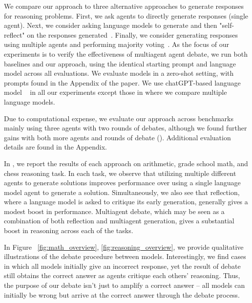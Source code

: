  




 We compare our approach to three alternative approaches to generate responses for reasoning problems. First, we ask agents to directly generate responses (single agent). Next, we consider asking language models to generate and then "self-reflect" on the responses generated~\cite{reflexion, madaan2023self}. Finally, we consider generating responses using multiple agents and performing majority voting~\cite{alphacode,verifier}. As the focus of our experiments is to verify the effectiveness of multiagent agent debate, we run both baselines and our approach, using the identical starting prompt and language model across all evaluations. We evaluate models in a zero-shot setting, with prompts found in the Appendix of the paper. We use chatGPT-based language model ~\cite{chatgpt2022} in all our experiments except those in  where we compare multiple language models.

Due to computational expense, we evaluate our approach across benchmarks mainly using three agents with two rounds of debates, although we found further gains with both more agents and rounds of debate (). Additional evaluation details are found in the Appendix.



 In , we report the results of each approach on arithmetic, grade school math, and chess reasoning task. In each task, we observe that utilizing multiple different agents to generate solutions improves performance over using a single language model agent to generate a solution. Simultaneously, we also see that reflection, where a language model is asked to critique its early generation, generally gives a modest boost in performance. Multiagent debate, which may be seen as a combination of both reflection and multiagent generation, gives a substantial boost in reasoning across each of the tasks.  



 In Figure ~\ref{fig:math_overview}, \ref{fig:reasoning_overview}, we provide qualitative illustrations of the debate procedure between models. Interestingly, we find cases in which all models initially give an incorrect response, yet the result of debate still obtains the correct answer as agents critique each others' reasoning. Thus, the purpose of our debate isn't just to amplify a correct answer -- all models can initially be wrong but arrive at the correct answer through the debate process.


